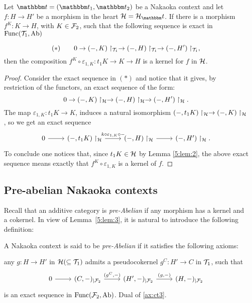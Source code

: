 \begin{lemma}\label{5:lem:3}
Let $\t=(\t_1,\t_2)$ be a Nakaoka context and let $f\colon H\to H'$ be a morphism in the heart $\clH=\clH_\t$. If there is a morphism $f^K\colon K\to H$, with $K\in \mathcal{F}_2$, such that the following sequence is exact in $\mathrm{Func}(\mathcal{T}_1, \mathrm{Ab})$

\begin{equation*}
(*)\qquad 0\to (-,K)\restriction_{\mathcal{T}_1}\to (-,H)\restriction_{\mathcal{T}_1}\to (-,H')\restriction_{\mathcal{T}_1},
\end{equation*}
then the composition $f^K\circ \varepsilon_{1,K}\colon t_1K\to K\to H$ is a kernel for $f$ in $\mathcal{H}$.
\end{lemma}
\begin{proof}
Consider the exact sequence in $(*)$ and notice that it gives, by restriction of the functors, an exact sequence of the form:
\begin{equation*}
0\to (-,K)\restriction_{\mathcal{H}}\to (-,H)\restriction_{\mathcal{H}}\to (-,H')\restriction_{\mathcal{H}}.
\end{equation*}
The map $\varepsilon_{1,K}\colon t_1K\to K$, induces a natural isomorphism $(-,t_1K)\restriction_{\mathcal{H}} \to (-,K)\restriction_{\mathcal{H}}$, so we get an exact sequence
\begin{equation*}
\begin{tikzcd}
  0\arrow{r}
  & (-,t_1K)\restriction_{\clH}\arrow{r}{k\circ \varepsilon_{1,K}\circ -}
  & (-,H)\restriction_{\clH}\arrow{r}
  & (-,H')\restriction_{\clH}.
\end{tikzcd}
\end{equation*}
To conclude one notices that, since $t_1K\in\mathcal{H}$ by Lemma \ref{5:lem:2}, the above exact sequence means exactly that $f^K\circ \varepsilon_{1,K}$ is a kernel of $f$.
\end{proof}


\subsection{Pre-abelian Nakaoka contexts}
Recall that an additive category is  \emph{pre-Abelian} if any morphism has a kernel and a cokernel. In view of Lemma~\ref{5:lem:3}, it is natural to introduce the following definition:

\begin{definition}
A Nakaoka context is said to be \emph{pre-Abelian} if it satisfies the following axioms:
\begin{torsionaxioms}\setcounter{enumi}{2}
\item\label{ax:ct3} any  $g\colon H\to H'$ in $\mathcal{H}(\subseteq \mathcal{T}_1)$ admits a pseudocokernel $g^C\colon H'\to C$ in $\mathcal{T}_1$, such that
\begin{equation*}
\begin{tikzcd}
0\arrow{r} &(C,-)_{|\F_2}\arrow{r}{(g^C,-)} & (H',-)_{|\F_2}\arrow{r}{(g,-)}& (H,-)_{|\F_2}
\end{tikzcd}
\end{equation*}
is an exact sequence in $\mathrm{Func}(\mathcal{F}_2,\mathrm{Ab})$.
\varitem{^\ast}\label{ax:ct3op} Dual of \ref{ax:ct3}.
\end{torsionaxioms}
\end{definition}

